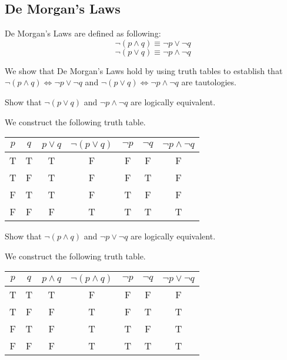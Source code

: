 \documentclass{article}
\newtheorem{theorem}{Theorem}[subsection]
\newtheorem{example}{Example}[subsection]
\begin{document}
\subsection{De Morgan's Laws}
\begin{tcolorbox}
[colback=green!5!white,colframe=green!75!black,title=\begin{theorem}
\end{theorem}]
De Morgan's Laws are defined as following:
$$\neg (p\wedge q)\equiv\neg p \lor \neg q$$
$$\neg(p \lor q)\equiv \neg p \wedge \neg q$$
\end{tcolorbox}
We show that De Morgan's Laws hold by using truth tables to establish that $\neg (p\wedge q)\iff\neg p \lor \neg q$ and $\neg(p \lor q)\iff \neg p \wedge \neg q$ are tautologies.
\begin{tcolorbox}
[colback=red!5!white,colframe=red!75!black,title=\begin{example}
\end{example}] 
Show that $\neg(p \lor q)$ and $\neg p \wedge \neg q$ are logically equivalent.
\end{tcolorbox}
We construct the following truth table.
\begin{table}[h]
      \centering
      \begin{tabular}{|c|c|c|c|c|c|c|}
      \hline
           $p$&$q$&$p\lor q$&$\neg(p\lor q)$&$\neg p$&$\neg q$&$\neg  p\wedge \neg q$ \\ \hline
           T&T&T&F&F&F&F\\ \hline
           T&F&T&F&F&T&F\\ \hline
           F&T&T&F&T&F&F\\ \hline
           F&F&F&T&T&T&T\\ \hline
      \end{tabular}
\end{table}
\begin{tcolorbox}
[colback=red!5!white,colframe=red!75!black,title=\begin{example}
\end{example}]
Show that $\neg (p \wedge q)$ and $\neg p\lor \neg q$ are logically equivalent.
\end{tcolorbox}
We construct the following truth table.
\begin{table}[h]
      \centering
      \begin{tabular}{|c|c|c|c|c|c|c|}
      \hline
            $p$&$q$&$p\wedge q$&$\neg(p\wedge q)$&$\neg p$&$\neg q$&$\neg p\lor \neg q$ \\ \hline
            T&T&T&F&F&F&F\\ \hline
            T&F&F&T&F&T&T\\ \hline
            F&T&F&T&T&F&T\\ \hline
            F&F&F&T&T&T&T\\ \hline
        \end{tabular}
\end{table}
\end{document}

